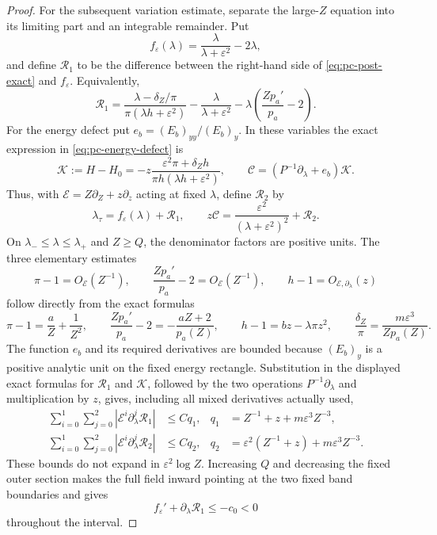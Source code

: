 \begin{proof}
For the subsequent variation estimate, separate the large-$Z$ equation
into its limiting part and an integrable remainder. Put
\[
 f_\varepsilon(\lambda)=\frac{\lambda}{\lambda+\varepsilon^2}-2\lambda,
\]
and define $\mathcal R_1$ to be the difference between the right-hand
side of \eqref{eq:pc-post-exact} and $f_\varepsilon$.  Equivalently,
\[
 \mathcal R_1=
 \frac{\lambda-\delta_Z/\pi}{\pi(\lambda h+\varepsilon^2)}
 -\frac{\lambda}{\lambda+\varepsilon^2}
 -\lambda\left(\frac{Zp_a'}{p_a}-2\right).
\]
For the energy defect put $e_b=(E_b)_{yy}/(E_b)_y$.  In these variables
the exact expression in \eqref{eq:pc-energy-defect} is
\[
 \mathcal K:=H-H_0
 =-z\frac{\varepsilon^2\pi+\delta_Zh}
             {\pi h(\lambda h+\varepsilon^2)},\qquad
 \mathcal C=(P^{-1}\partial_\lambda+e_b)\mathcal K.
\]
Thus, with $\mathcal E=Z\partial_Z+z\partial_z$ acting at fixed
$\lambda$, define $\mathcal R_2$ by
\begin{equation}
\label{eq:pc-post-remainders}
 \lambda_\tau=f_\varepsilon(\lambda)+\mathcal R_1,\qquad
 z\mathcal C=\frac{\varepsilon^2}{(\lambda+\varepsilon^2)^2}
          +\mathcal R_2.
\end{equation}
On $\lambda_-\le\lambda\le\lambda_+$ and $Z\ge Q$, the denominator
factors are positive units.  The three elementary estimates
\[
 \pi-1=O_{\mathcal E}(Z^{-1}),\qquad
 \frac{Zp_a'}{p_a}-2=O_{\mathcal E}(Z^{-1}),\qquad
 h-1=O_{\mathcal E,\partial_\lambda}(z)
\]
follow directly from the exact formulas
\[
 \pi-1=\frac aZ+\frac1{Z^2},\qquad
 \frac{Zp_a'}{p_a}-2=-\frac{aZ+2}{p_a(Z)},\qquad
 h-1=bz-\lambda\pi z^2,\qquad
 \frac{\delta_Z}{\pi}=\frac{m\varepsilon^3}{Zp_a(Z)}.
\]
The function $e_b$ and its required derivatives are bounded because
$(E_b)_y$ is a positive analytic unit on the fixed energy rectangle.
Substitution in the displayed exact formulas for $\mathcal R_1$ and
$\mathcal K$, followed by the two operations
$P^{-1}\partial_\lambda$ and multiplication by $z$, gives, including
all mixed derivatives actually used,
\begin{equation}\label{eq:pc-post-remainder-jets}
 \begin{aligned}
 \sum_{i=0}^1\sum_{j=0}^2
  |\mathcal E^i\partial_\lambda^j\mathcal R_1|
  &\le C q_1, & q_1&=Z^{-1}+z+m\varepsilon^3Z^{-3},\\
 \sum_{i=0}^1\sum_{j=0}^2
  |\mathcal E^i\partial_\lambda^j\mathcal R_2|
  &\le C q_2, & q_2&=\varepsilon^2(Z^{-1}+z)
                         +m\varepsilon^3Z^{-3}.
 \end{aligned}
\end{equation}
These bounds do not expand in $\varepsilon^2\log Z$. Increasing $Q$
and decreasing the fixed outer section makes the full field inward
pointing at the two fixed band boundaries and gives
\[
 f_\varepsilon'+\partial_\lambda\mathcal R_1\le-c_0<0
\]
throughout the interval.


\end{proof}
